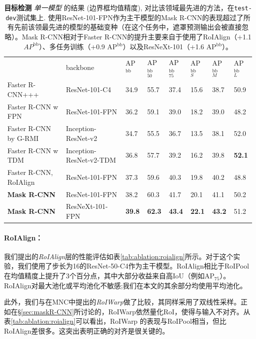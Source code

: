 \begin{table}[t]
\begin{tabular}{l|l|x{22}x{22}x{22}|x{22}x{22}x{22}}
 & backbone
 & AP$^\text{bb}$ & AP$^\text{bb}_{50}$ & AP$^\text{bb}_{75}$
 & AP$^\text{bb}_S$ & AP$^\text{bb}_M$ &  AP$^\text{bb}_L$\\ [.1em]
\shline
 Faster R-CNN+++  & ResNet-101-C4
  & 34.9 & 55.7 & 37.4 & 15.6 & 38.7 & 50.9\\
 Faster R-CNN w FPN  & ResNet-101-FPN
  & 36.2 & 59.1 & 39.0 & 18.2 & 39.0 & 48.2\\
 Faster R-CNN by G-RMI  & Inception-ResNet-v2
  & 34.7 & 55.5 & 36.7 & 13.5 & 38.1 & 52.0\\
 Faster R-CNN w TDM  & Inception-ResNet-v2-TDM
  & 36.8 & 57.7 & 39.2 & 16.2 & 39.8 & \textbf{52.1}\\
\hline
  Faster R-CNN, RoIAlign & ResNet-101-FPN
  & 37.3 & 59.6 & 40.3 & 19.8 & 40.2 & 48.8\\
 \textbf{Mask R-CNN} & ResNet-101-FPN
  & 38.2 & 60.3 & 41.7 & 20.1 & 41.1 & 50.2\\
 \textbf{Mask R-CNN} & ResNeXt-101-FPN
  & \textbf{39.8} & \textbf{62.3} & \textbf{43.4} & \textbf{22.1} & \textbf{43.2} & {51.2}
\end{tabular}
\caption{\textbf{目标检测} \emph{单一模型} 的结果 (边界框均值精度), 对比该领域最先进的方法，在\texttt{test-dev}测试集上. 使用ResNet-101-FPN作为主干模型的Mask R-CNN的表现超过了所有先前该领最先进的模型的基础变种（在这个任务中，遮罩预测输出会被直接忽略）。Mask R-CNN相对于Faster R-CNN的提升主要来自于使用了RoIAlign（+1.1 $AP^\text{bb}$）、多任务训练（+0.9 AP$^\text{bb}$）以及ResNeXt-101（+1.6 AP$^\text{bb}$）。}
\label{tab:final_bbox}
\end{table}

\paragraph{RoIAlign：} 我们提出的\emph{RoIAlign}层的性能评估如表\ref{tab:ablation:roialign}所示。对于这个实验，我们使用了步长为16的ResNet-50-C4作为主干模型。RoIAlign相比于RoIPool在均值精度上提升了3个百分点，其中大部分收益来自高IoU（例如AP$_{75}$）。RoIAlign对最大池化或平均池化不敏感;我们在本文的其余部分均使用平均池化。

此外，我们与在MNC中提出的\emph{RoIWarp}做了比较，其同样采用了双线性采样。正如在\S\ref{sec:maskR-CNN}所讨论的，RoIWarp依然量化RoI，使得与输入不对齐。从表\ref{tab:ablation:roialign}可以看出，RoIWarp 的表现与RoIPool相当，但比RoIAlign差很多。这突出表明正确的对齐是很关键的。


